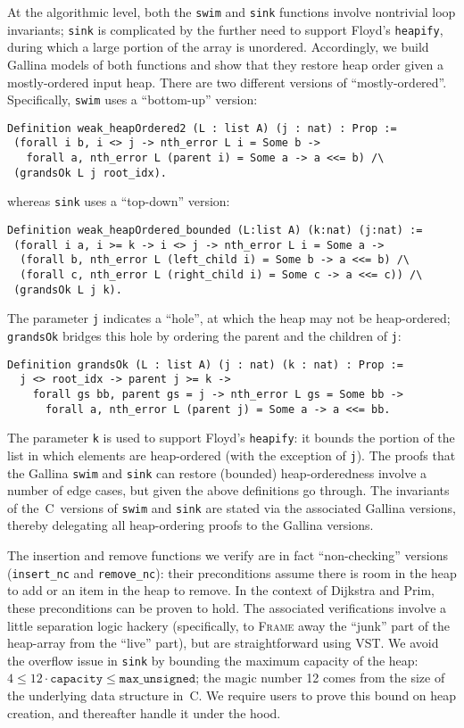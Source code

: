 At the algorithmic level, both the \texttt{swim} and \texttt{sink} functions involve nontrivial loop invariants; \texttt{sink} is complicated by the further need to support Floyd's \texttt{heapify}, during which a large portion of the array is unordered.  Accordingly, we build Gallina models of both functions and show that they restore heap order given a mostly-ordered input heap.  There are two different versions of ``mostly-ordered''. Specifically, \texttt{swim} uses a ``bottom-up'' version:
\begin{lstlisting}[firstnumber=9]
Definition weak_heapOrdered2 (L : list A) (j : nat) : Prop :=
 (forall i b, i <> j -> nth_error L i = Some b ->
   forall a, nth_error L (parent i) = Some a -> a <<= b) /\
 (grandsOk L j root_idx).
\end{lstlisting}
whereas \texttt{sink} uses a ``top-down'' version:
\begin{lstlisting}[firstnumber=13]
Definition weak_heapOrdered_bounded (L:list A) (k:nat) (j:nat) :=
 (forall i a, i >= k -> i <> j -> nth_error L i = Some a ->
  (forall b, nth_error L (left_child i) = Some b -> a <<= b) /\
  (forall c, nth_error L (right_child i) = Some c -> a <<= c)) /\
 (grandsOk L j k).
\end{lstlisting}
The parameter \texttt{j} indicates a ``hole'', at which the heap may not be heap-ordered; \texttt{grandsOk} bridges this hole by
ordering the parent and the children of \texttt{j}:
\begin{lstlisting}[firstnumber=5]
Definition grandsOk (L : list A) (j : nat) (k : nat) : Prop :=
  j <> root_idx -> parent j >= k ->
    forall gs bb, parent gs = j -> nth_error L gs = Some bb ->
      forall a, nth_error L (parent j) = Some a -> a <<= bb.
\end{lstlisting}
The parameter \texttt{k} is used to support Floyd's \texttt{heapify}: it bounds the portion of the list in which elements are heap-ordered (with the exception of \texttt{j}).  The proofs that the Gallina \texttt{swim} and \texttt{sink} can restore (bounded) heap-orderedness involve a number of edge cases, but given the above definitions go through.  The invariants of the~C~versions of \texttt{swim} and \texttt{sink} are stated via the associated
Gallina versions, thereby delegating all heap-ordering proofs to the Gallina versions.

The insertion and remove functions we verify are in fact ``non-checking'' versions (\texttt{insert\_nc} and \texttt{remove\_nc}): their preconditions assume there is room in the heap to add or an item in the heap to remove.  In the context of Dijkstra and Prim, these preconditions can be proven to hold.  The associated verifications involve a little separation logic hackery (specifically, to \textsc{Frame} away the ``junk'' part of the heap-array from the ``live'' part), but are straightforward using VST.  We avoid the overflow issue in \texttt{sink} by bounding the maximum capacity of the heap: $4 \le 12\cdot\texttt{capacity} \leq \texttt{max\_unsigned}$; the magic number 12 comes from the size of the underlying data structure in~C.  We require users to prove this bound on heap creation, and thereafter handle it under the hood.

